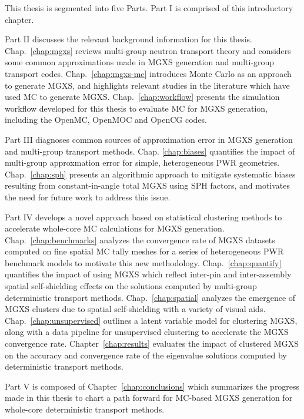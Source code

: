 This thesis is segmented into five Parts. Part I is comprised of this introductory chapter.

Part II discusses the relevant background information for this thesis. Chap.~\ref{chap:mgxs} reviews multi-group neutron transport theory and considers some common approximations made in \ac{MGXS} generation and multi-group transport codes. Chap.~\ref{chap:mgxs-mc} introduces Monte Carlo as an approach to generate \ac{MGXS}, and highlights relevant studies in the literature which have used \ac{MC} to generate \ac{MGXS}. Chap.~\ref{chap:workflow} presents the simulation workflow developed for this thesis to evaluate \ac{MC} for \ac{MGXS} generation, including the OpenMC, OpenMOC and OpenCG codes.

Part III diagnoses common sources of approximation error in \ac{MGXS} generation and multi-group transport methods. Chap. \ref{chap:biases} quantifies the impact of multi-group approxmation error for simple, heterogeneous \ac{PWR} geometries. Chap.~\ref{chap:sph} presents an algorithmic approach to mitigate systematic biases resulting from constant-in-angle total \ac{MGXS} using \ac{SPH} factors, and motivates the need for future work to address this issue.

Part IV develops a novel approach based on statistical clustering methods to accelerate whole-core \ac{MC} calculations for \ac{MGXS} generation. Chap.~\ref{chap:benchmarks} analyzes the convergence rate of \ac{MGXS} datasets computed on fine spatial \ac{MC} tally meshes for a series of heterogeneous \ac{PWR} benchmark models to motivate this new methodology. Chap.~\ref{chap:quantify} quantifies the impact of using \ac{MGXS} which reflect inter-pin and inter-assembly spatial self-shielding effects on the solutions computed by multi-group deterministic transport methods. Chap.~\ref{chap:spatial} analyzes the emergence of \ac{MGXS} clusters due to spatial self-shielding with a variety of visual aids. Chap.~\ref{chap:unsupervised} outlines a latent variable model for clustering \ac{MGXS}, along with a data pipeline for unsupervised clustering to accelerate the \ac{MGXS} convergence rate. Chapter~\ref{chap:results} evaluates the impact of clustered \ac{MGXS} on the accuracy and convergence rate of the eigenvalue solutions computed by deterministic transport methods.

Part V is composed of Chapter~\ref{chap:conclusions} which summarizes the progress made in this thesis to chart a path forward for \ac{MC}-based \ac{MGXS} generation for whole-core deterministic transport methods.

